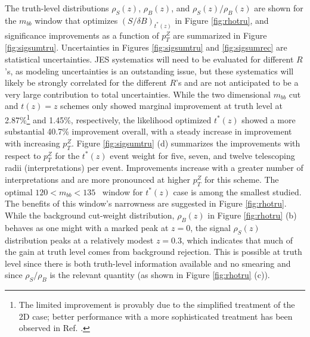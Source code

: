 The truth-level distributions $\rho_S\left(z\right)$, $\rho_B\left(z\right)$, and $\rho_S\left(z\right)/\rho_B\left(z\right)$ are shown for the $m_{bb}$ window that optimizes $(S/\delta B)_{t^*\left(z\right)}$ in Figure \ref{fig:rhotru}, and significance improvements as a function of $p_T^Z$ are summarized in Figure \ref{fig:sigsumtru}.  Uncertainties in Figures \ref{fig:sigsumtru} and \ref{fig:sigsumrec} are statistical uncertainties.  JES systematics will need to be evaluated for different $R$'s, as modeling uncertainties is an outstanding issue, but these systematics will likely be strongly correlated for the different $R$'s and are not anticipated to be a very large contribution to total uncertainties.  While the two dimensional $m_{bb}$ cut and $t\left(z\right)=z$ schemes only showed marginal improvement at truth level at 2.87\%\footnote{The limited improvement is provably due to the simplified treatment of the 2D case; better performance with a more sophisticated treatment has been observed in Ref. \cite{newschwartz}.}  and 1.45\%, respectively, the likelihood optimized $t^*\left(z\right)$ showed a more substantial 40.7\% improvement overall, with a steady increase in improvement with increasing $p_T^Z$.  Figure \ref{fig:sigsumtru} (d) summarizes the improvements with respect to $p_T^Z$ for the $t^*\left(z\right)$ event weight for five, seven, and twelve telescoping radii (interpretations) per event.  Improvements increase with a greater number of interpretations and are more pronounced at higher $p_T^Z$ for this scheme.%
  The optimal $120<m_{bb}<135$ \GeV\ window for $t^*\left(z\right)$ case is among the smallest studied.  The benefits of this window's narrowness are suggested in Figure \ref{fig:rhotru}.  While the background cut-weight distribution, $\rho_B\left(z\right)$ in Figure \ref{fig:rhotru} (b) behaves as one might with a marked peak at $z=0$, the signal $\rho_S\left(z\right)$ distribution peaks at a relatively modest $z=0.3$, which indicates that much of the gain at truth level comes from background rejection.  This is possible at truth level since there is both truth-level information available and no smearing and since $\rho_S/\rho_B$ is the relevant quantity (as shown in Figure \ref{fig:rhotru} (c)).

